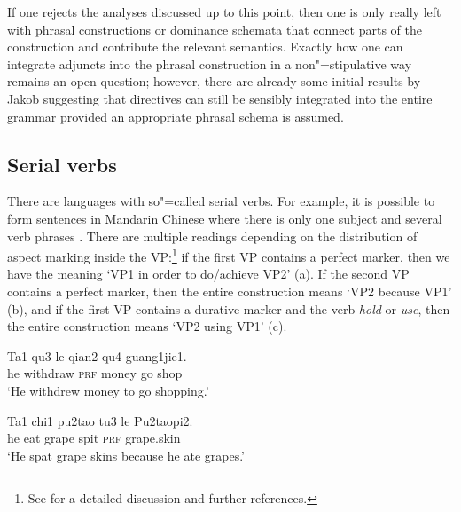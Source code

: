 \begin{exe}
\begin{xlist}[iv.]
\begin{exe}
\begin{xlist}[iv.]

If one rejects the analyses discussed up to this point, then one is only really left with phrasal constructions or dominance schemata that connect parts
of the construction and contribute the relevant semantics. Exactly how one can integrate adjuncts into the phrasal construction in a non"=stipulative way
remains an open question; however, there are already some initial results by Jakob \citet{Mache2010a} suggesting that directives can still be sensibly integrated into
the entire grammar provided an appropriate phrasal schema is assumed.

\subsection{Serial verbs}

There are languages with so"=called serial verbs. For
example, it is possible to form sentences in Mandarin Chinese where there is only one subject 
and several verb phrases \citep[Chapter~21]{LT81a}. There are multiple readings depending on the
distribution of aspect marking inside the VP:\footnote{%
  See  for a detailed discussion and further references.
} if the first VP contains a perfect marker, then we have
the meaning `VP1 in order to do/achieve VP2' (a). If the second VP contains a perfect marker, then the entire construction means `VP2 because VP1' (b), and if the
first VP contains a durative marker and the verb \emph{hold} or \emph{use}, then the entire
construction means `VP2 using VP1' (c). 

\eal
\ex
\gll Ta1 qu3 le qian2 qu4 guang1jie1. \\
     he withdraw \textsc{prf} money go shop \\
\glt `He withdrew money to go shopping.'


\ex
\gll Ta1 chi1 pu2tao tu3 le Pu2taopi2.\\
      he eat grape spit \textsc{prf} grape.skin\\
\glt `He spat grape skins because he ate grapes.'


\end{xlist}
\end{exe}
\end{xlist}
\end{exe}
